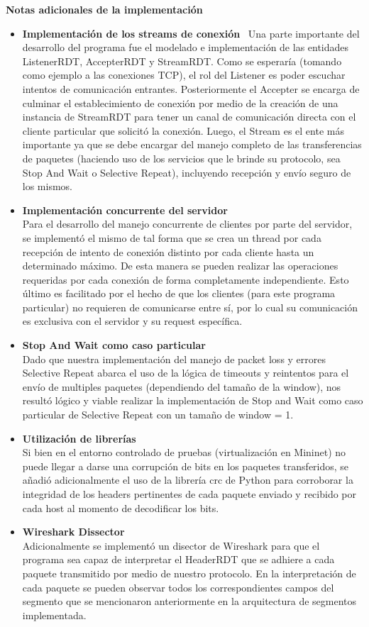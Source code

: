 \documentclass[11pt,a4paper]{article}
\begin{document}
\textbf{Notas adicionales de la implementación} \\
\begin{itemize}
    \item \textbf{Implementación de los streams de conexión} \
    Una parte importante del desarrollo del programa fue el modelado e implementación de las entidades ListenerRDT, AccepterRDT y StreamRDT.
    Como se esperaría (tomando como ejemplo a las conexiones TCP), el rol del Listener es poder escuchar intentos de comunicación entrantes. Posteriormente el Accepter se encarga de culminar el establecimiento de conexión por medio de la creación de una instancia de StreamRDT para tener un canal de comunicación directa con el cliente particular que solicitó la conexión. Luego, el Stream es el ente más importante ya que se debe encargar del manejo completo de las transferencias de paquetes (haciendo uso de los servicios que le brinde su protocolo, sea Stop And Wait o Selective Repeat), incluyendo recepción y envío seguro de los mismos.\
    \item \textbf{Implementación concurrente del servidor} \\
    Para el desarrollo del manejo concurrente de clientes por parte del servidor, se implementó el mismo de tal forma que se crea un thread por cada recepción de intento de conexión distinto por cada cliente hasta un determinado máximo. De esta manera se pueden realizar las operaciones requeridas por cada conexión de forma completamente independiente. Esto último es facilitado por el hecho de que los clientes (para este programa particular) no requieren de comunicarse entre sí, por lo cual su comunicación es exclusiva con el servidor y su request específica. 
    \item \textbf{Stop And Wait como caso particular} \\
    Dado que nuestra implementación del manejo de packet loss y errores Selective Repeat abarca el uso de la lógica de timeouts y reintentos para el envío de multiples paquetes (dependiendo del tamaño de la window), nos resultó lógico y viable realizar la implementación de Stop and Wait como caso particular de Selective Repeat con un tamaño de window = 1. 
    \item \textbf{Utilización de librerías} \\
    Si bien en el entorno controlado de pruebas (virtualización en Mininet) no puede llegar a darse una corrupción de bits en los paquetes transferidos, se añadió adicionalmente el uso de la librería crc de Python para corroborar la integridad de los headers pertinentes de cada paquete enviado y recibido por cada host al momento de decodificar los bits.
    \item \textbf{Wireshark Dissector} \\
    Adicionalmente se implementó un disector de Wireshark para que el programa sea capaz de interpretar el HeaderRDT que se adhiere a cada paquete transmitido por medio de nuestro protocolo. En la interpretación de cada paquete se pueden observar todos los correspondientes campos del segmento que se mencionaron anteriormente en la arquitectura de segmentos implementada. 
\end{itemize}
\end{document}
